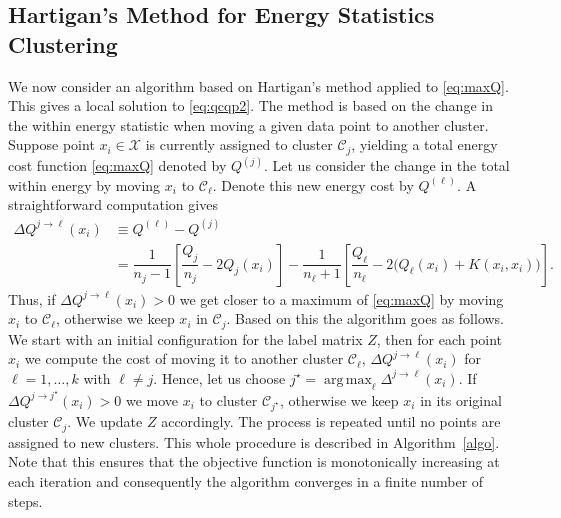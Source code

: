 \documentclass[aps,preprint,nofootinbib,floatfix]{revtex4-1}
\DeclareMathOperator*{\argmax}{arg\,max}
\newcommand\kk{K}
\newcommand\C{{\mathcal{C}}}
\begin{document}
\subsection*{Hartigan's Method for Energy Statistics Clustering}

We now consider an algorithm based on Hartigan's method \cite{Hartigan} 
applied to \eqref{eq:maxQ}. This gives a local solution to 
\eqref{eq:qcqp2}. 
The method is based on the change
in the within energy statistic when moving a given data point to
another cluster.
Suppose point $x_i \in \mathcal{X}$
is currently assigned to  cluster $\C_j$, yielding
a total energy cost function \eqref{eq:maxQ} denoted by $Q^{(j)}$.
Let us consider the change in the total within energy by moving
$x_i$ to $\C_\ell$. 
Denote this new energy cost by $Q^{(\ell)}$.
A straightforward computation gives
\begin{equation}
\label{eq:changeQ}
\begin{split}
\Delta Q^{j \to \ell}(x_i) &\equiv Q^{(\ell)} - Q^{(j)} \\ 
&= 
\dfrac{1}{n_j - 1}\left[ \dfrac{Q_j}{n_j} - 2 Q_j(x_i) \right]
- \dfrac{1}{n_\ell + 1}\left[ \dfrac{Q_\ell}{n_\ell} - 2 \big(Q_\ell(x_i) + 
\kk(x_i,x_i)\big) 
\right].
\end{split}
\end{equation}
Thus, if $\Delta Q^{j\to \ell}(x_i) > 0$ we get closer to a 
maximum of \eqref{eq:maxQ} by
moving $x_i$ to $\C_\ell$, otherwise we keep $x_i$ in $\C_j$. Based on
this the algorithm goes as follows.
We start with an initial configuration for the label matrix $Z$, 
then for each
point $x_i$ 
we compute the cost of moving it to another cluster $\C_\ell$,
$\Delta Q^{j\to \ell}(x_i)$ for 
$\ell=1,\dots,k$ with $\ell \ne j$. Hence, let us choose
$j^\star = \argmax_\ell \Delta^{j \to \ell}(x_i)$.
If $\Delta Q^{j \to j^\star}(x_i) > 0$ 
we move $x_i$ to cluster $\C_{j^\star}$, otherwise 
we keep $x_i$ in its original cluster $\C_j$. We update $Z$ accordingly.
The process is repeated
until no points are assigned to new clusters. 
This whole procedure is described in Algorithm~\ref{algo}.
Note that this ensures that the objective function is
monotonically increasing at each iteration and consequently the algorithm
converges in a finite number of steps.
\end{document}
